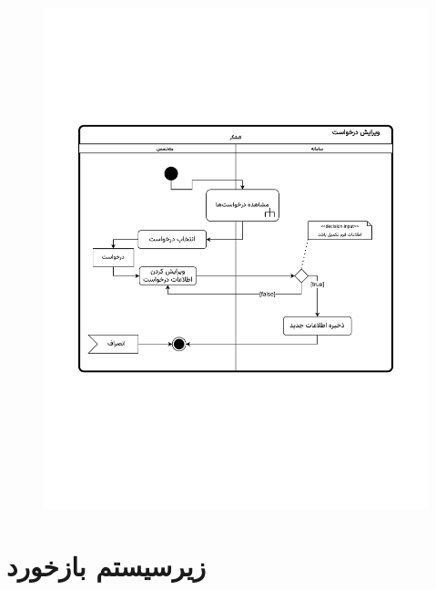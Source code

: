 \begin{figure}[ht!]
	\centering
	\includegraphics[scale=0.8, page=1]{figs/OOD-activity-editreq.pdf}
\end{figure}
\FloatBarrier
\newpage


\section{زیرسیستم بازخورد}


